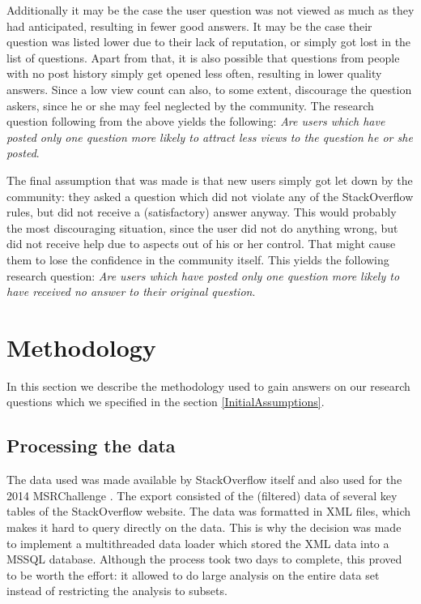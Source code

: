 \documentclass[conference]{IEEEtran}
\begin{document}
Additionally it may be the case the user question was not viewed as much as
they had anticipated, resulting in fewer good answers. It may be the case their
question was listed lower due to their lack of reputation, or simply got lost
in the list of questions. Apart from that, it is also possible that questions
from people with no post history simply get opened less often, resulting in
lower quality answers. Since a low view count can also, to some extent,
discourage the question askers, since he or she may feel neglected by the
community. The research question following from the above yields the following:
\textit{Are users which have posted only one question more likely to attract
less views to the question he or she posted}.

The final assumption that was made is that new users simply got let down by the
community: they asked a question which did not violate any of the StackOverflow
rules, but did not receive a (satisfactory) answer anyway. This would probably
the most discouraging situation, since the user did not do anything wrong, but
did not receive help due to aspects out of his or her control. That might cause
them to lose the confidence in the community itself. This yields the following
research question: \textit{Are users which have posted only one question more
likely to have received no answer to their original question}. 

\section{Methodology} \label{Methodology}

In this section we describe the methodology used to gain answers on our
research questions which we specified in the section \ref{InitialAssumptions}.

\subsection{Processing the data}

The data used was made available by StackOverflow itself and also used for the
2014 MSRChallenge \cite{MSRChallenge2015}. The export consisted of the
(filtered) data of several key tables of the StackOverflow website. The data
was formatted in XML files, which makes it hard to query directly on the data.
This is why the decision was made to implement a multithreaded data loader
which stored the XML data into a MSSQL database. Although the process took two
days to complete, this proved to be worth the effort: it allowed to do large
analysis on the entire data set instead of restricting the analysis to subsets.
\end{document}
